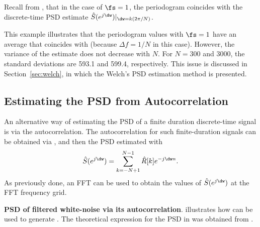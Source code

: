 Recall from , that in the case of $\fs=1$, the periodogram 
coincides with the discrete-time PSD estimate $\hat S(e^{j \dw})|_{\dw = k (2 \pi/N)}$.

This example illustrates that the periodogram values with $\fs=1$ have an average  that coincides with  (because $\Delta f = 1/N$ in this case). However, the variance of the estimate does not decrease with $N$.  For $N=300$ and 3000, the standard deviations are 593.1 and 599.4, respectively. This issue is discussed in Section~\ref{sec:welch}, in which the Welch's PSD estimation method is presented.
\eExample



\subsection{Estimating the PSD from Autocorrelation}

An alternative way of estimating the PSD 
of a finite duration discrete-time signal is via the autocorrelation.
The autocorrelation for such finite-duration signals can be obtained via ,
and then the PSD estimated with
\begin{equation}
\hat S(e^{j \dw}) = \sum_{k=-N+1}^{N-1} \hat R[k] e^{-j \dw n}.
\label{eq:psd_via_xcorr}
\end{equation}
As previously done, an FFT can be used to obtain the values of $\hat S(e^{j \dw})$ at the FFT frequency grid.

\bExample \textbf{PSD of filtered white-noise via its autocorrelation}.
 illustrates how  can be used to generate .
The theoretical expression for the PSD in  was obtained from .



